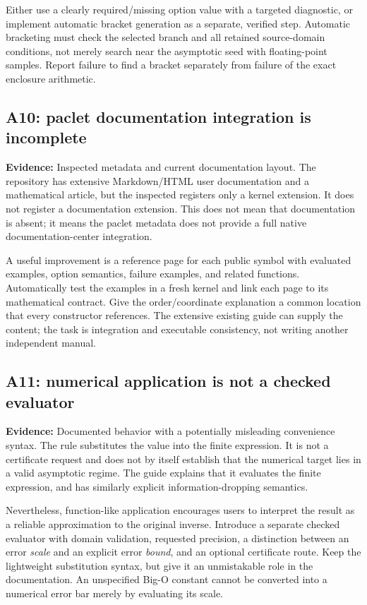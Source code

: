 \documentclass[11pt,a4paper]{article}
\newcommand{\code}[1]{\texttt{\detokenize{#1}}}
\newcommand{\status}[1]{\textbf{Evidence:} #1.}
\theoremstyle{remark}\newtheorem{remark}[proposition]{Remark}
\begin{document}
Either use a clearly required/missing option value with a targeted diagnostic, or implement automatic bracket generation as a separate, verified step. Automatic bracketing must check the selected branch and all retained source-domain conditions, not merely search near the asymptotic seed with floating-point samples. Report failure to find a bracket separately from failure of the exact enclosure arithmetic.

\subsection{A10: paclet documentation integration is incomplete}
\status{Inspected metadata and current documentation layout}
The repository has extensive Markdown/HTML user documentation and a mathematical article, but the inspected \code{PacletInfo.wl} registers only a kernel extension. It does not register a documentation extension. This does not mean that documentation is absent; it means the paclet metadata does not provide a full native documentation-center integration.\cite{paclet,guide,development}

A useful improvement is a reference page for each public symbol with evaluated examples, option semantics, failure examples, and related functions. Automatically test the examples in a fresh kernel and link each page to its mathematical contract. Give the order/coordinate explanation a common location that every constructor references. The extensive existing guide can supply the content; the task is integration and executable consistency, not writing another independent manual.

\subsection{A11: numerical application is not a checked evaluator}
\status{Documented behavior with a potentially misleading convenience syntax}
The rule \code{s[value]} substitutes the value into the finite expression. It is not a certificate request and does not by itself establish that the numerical target lies in a valid asymptotic regime. The guide explains that it evaluates the finite expression, and \code{Normal} has similarly explicit information-dropping semantics.\cite{core,guide}

Nevertheless, function-like application encourages users to interpret the result as a reliable approximation to the original inverse. Introduce a separate checked evaluator with domain validation, requested precision, a distinction between an error \emph{scale} and an explicit error \emph{bound}, and an optional certificate route. Keep the lightweight substitution syntax, but give it an unmistakable role in the documentation. An unspecified Big-O constant cannot be converted into a numerical error bar merely by evaluating its scale.
\end{document}
